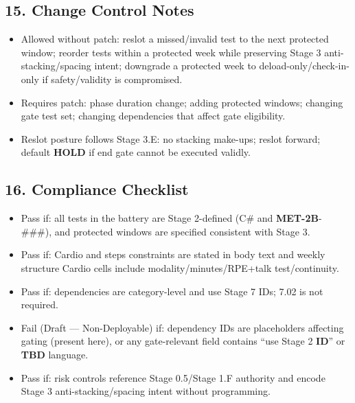 \documentclass[10pt]{article}
\begin{document}
\subsection*{15. Change Control Notes}


\begin{itemize}
\item Allowed without patch: reslot a missed/invalid test to the next protected window; reorder tests within a protected week while preserving Stage 3 anti-stacking/spacing intent; downgrade a protected week to deload-only/check-in-only if safety/validity is compromised.
\item Requires patch: phase duration change; adding protected windows; changing gate test set; changing dependencies that affect gate eligibility.
\item Reslot posture follows Stage 3.E: no stacking make-ups; reslot forward; default \textbf{HOLD} if end gate cannot be executed validly.
\end{itemize}

\subsection*{16. Compliance Checklist}


\begin{itemize}
\item Pass if: all tests in the battery are Stage 2-defined (C\# and \textbf{MET-2B}-###), and protected windows are specified consistent with Stage 3.
\item Pass if: Cardio and steps constraints are stated in body text and weekly structure Cardio cells include modality/minutes/RPE+talk test/continuity.
\item Pass if: dependencies are category-level and use Stage 7 IDs; 7.02 is not required.
\item Fail (Draft — Non-Deployable) if: dependency IDs are placeholders affecting gating (present here), or any gate-relevant field contains “use Stage 2 \textbf{ID}” or \textbf{TBD} language.
\item Pass if: risk controls reference Stage 0.5/Stage 1.F authority and encode Stage 3 anti-stacking/spacing intent without programming.
\end{itemize}
\end{document}
